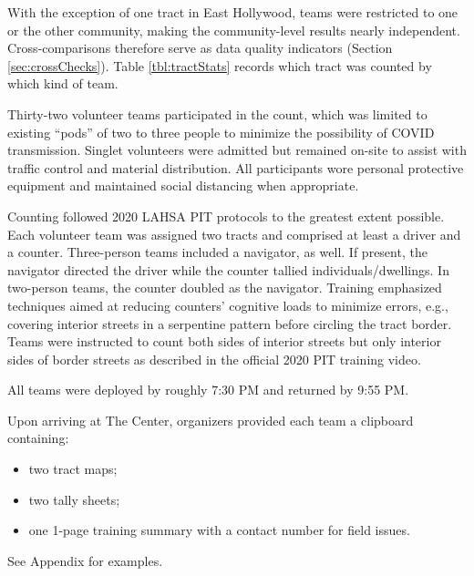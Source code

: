 \documentclass[11pt,twocolumn]{article}
\def\Count{count}
\begin{document}
With 
the exception of one tract in East Hollywood, teams were restricted to one or the other community, 
making the community-level results nearly independent. Cross-comparisons therefore serve as data 
quality indicators (Section \ref{sec:crossChecks}). Table \ref{tbl:tractStats} records which tract was 
counted by which kind of team. 

Thirty-two volunteer teams participated in the \Count, which was limited to existing ``pods'' of two 
to three people to minimize the possibility of COVID transmission. Singlet volunteers were admitted 
but remained on-site to assist with traffic control and material distribution. All participants wore 
personal protective equipment and maintained social distancing when appropriate.

Counting followed 2020 LAHSA PIT protocols to the greatest extent possible. Each volunteer team 
was assigned two tracts and comprised at least a driver and a counter. Three-person teams 
included a navigator, as well. If present, the navigator directed the driver while the counter tallied 
individuals/dwellings. In two-person teams, the counter doubled as the navigator. Training 
emphasized techniques aimed at reducing counters' cognitive loads to minimize errors, e.g., 
covering interior streets in a serpentine pattern before circling the tract border. Teams were 
instructed to count both sides of interior streets but only interior sides of border streets as described 
in the official 2020 PIT training video.

All teams were deployed by roughly 7:30 PM and returned by 9:55 PM.

Upon arriving at The Center, organizers provided each team a clipboard containing:
\begin{itemize}
	\item two tract maps;
	\item two tally sheets;
	\item one 1-page training summary with a contact number for field issues.
\end{itemize}
See Appendix for examples.
\end{document}
